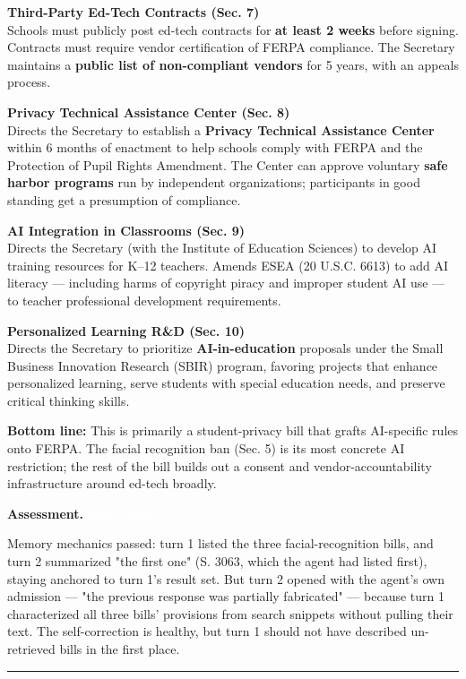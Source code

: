 \documentclass[11pt]{article}
\newcommand{\fieldlabel}[1]{\textbf{\color{navy}#1}\quad}
\begin{document}
\textbf{Third-Party Ed-Tech Contracts (Sec. 7)} \\
Schools must publicly post ed-tech contracts for \textbf{at least 2 weeks} before signing. Contracts must require vendor certification of FERPA compliance. The Secretary maintains a \textbf{public list of non-compliant vendors} for 5 years, with an appeals process.

\textbf{Privacy Technical Assistance Center (Sec. 8)} \\
Directs the Secretary to establish a \textbf{Privacy Technical Assistance Center} within 6 months of enactment to help schools comply with FERPA and the Protection of Pupil Rights Amendment. The Center can approve voluntary \textbf{safe harbor programs} run by independent organizations; participants in good standing get a presumption of compliance.

\textbf{AI Integration in Classrooms (Sec. 9)} \\
Directs the Secretary (with the Institute of Education Sciences) to develop AI training resources for K--12 teachers. Amends ESEA (20 U.S.C. 6613) to add AI literacy --- including harms of copyright piracy and improper student AI use --- to teacher professional development requirements.

\textbf{Personalized Learning R\&D (Sec. 10)} \\
Directs the Secretary to prioritize \textbf{AI-in-education} proposals under the Small Business Innovation Research (SBIR) program, favoring projects that enhance personalized learning, serve students with special education needs, and preserve critical thinking skills.

\textbf{Bottom line:} This is primarily a student-privacy bill that grafts AI-specific rules onto FERPA. The facial recognition ban (Sec. 5) is its most concrete AI restriction; the rest of the bill builds out a consent and vendor-accountability infrastructure around ed-tech broadly.

\fieldlabel{Assessment.} \colorbox{partialorange}{\textcolor{white}{\bfseries PARTIAL}}\par
Memory mechanics passed: turn 1 listed the three facial-recognition bills, and turn 2 summarized "the first one" (S. 3063, which the agent had listed first), staying anchored to turn 1's result set. But turn 2 opened with the agent's own admission --- "the previous response was partially fabricated" --- because turn 1 characterized all three bills' provisions from search snippets without pulling their text. The self-correction is healthy, but turn 1 should not have described un-retrieved bills in the first place.
\vspace{4pt}\hrule\vspace{8pt}
\end{document}
